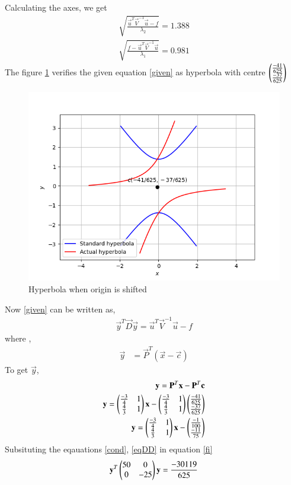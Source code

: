 \documentclass[journal,12pt,twocolumn]{IEEEtran}
\begin{document}
Calculating the axes, we get
\begin{align}
\sqrt{\frac{\vec{u}^T\vec{V}^{-1}\vec{u}-f}{\lambda_2}}=1.388\\
\sqrt{\frac{f-\vec{u}^T\vec{V}^{-1}\vec{u}}{\lambda_1}}=0.981
\end{align}
The figure \ref{Fig :1} verifies the given equation \eqref{given} as hyperbola with centre $\begin{pmatrix}\frac{-41}{625}\\\frac{-37}{625}\end{pmatrix}$
\renewcommand{\thefigure}{1}
\begin{figure}[h]
    \centering
    \includegraphics[width=\columnwidth]{Hyperbola.png}
    \caption{Hyperbola when origin is shifted}
    \label{Fig :1}
\end{figure}
\item  Now \eqref{given} can be written as,
\begin{align}
    \vec{y}^T\vec{D}\vec{y}=\vec{u}^T\vec{V}^{-1}\vec{u}-f\label{fi}
\end{align}
where ,
\begin{align}
    \vec{y}&=\vec{P}^T(\vec{x}-\vec{c})
\end{align}
To get $\vec{y}$,
\begin{align}
    \mathbf{y}=\mathbf{P}^T\mathbf{x}-\mathbf{P}^T\mathbf{c}\\
    \mathbf{y}=\begin{pmatrix}\frac{-3}{4}&1\\\frac{4}{3}&1\end{pmatrix}\mathbf{x}-
    \begin{pmatrix}\frac{-3}{4}&1\\\frac{4}{3}&1\end{pmatrix}\begin{pmatrix}\frac{-41}{625}\\\frac{-37}{625}\end{pmatrix}\\
    \mathbf{y}=\begin{pmatrix}\frac{-3}{4}&1\\\frac{4}{3}&1\end{pmatrix}\mathbf{x}-
    \begin{pmatrix}\frac{-1}{100}\\\frac{-11}{75}\end{pmatrix}
\end{align}
Subsituting the eqauations \eqref{cond}, \eqref{eqDD} in equation \eqref{fi}
\begin{align}
    \mathbf{y}^T\begin{pmatrix}50&0\\0&-25\end{pmatrix}\mathbf{y}=\frac{-30119}{625}
\end{align}
\end{document}
